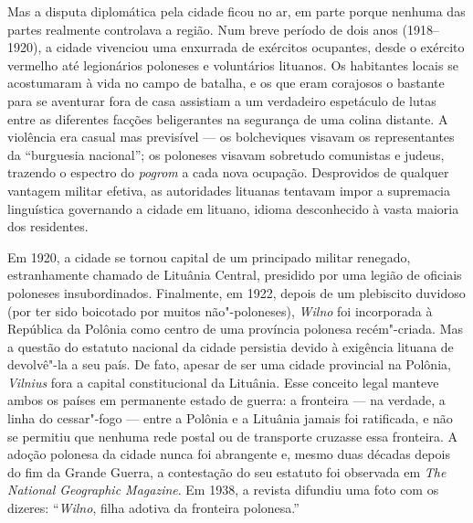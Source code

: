 Mas a disputa diplomática pela cidade ficou no ar, em parte porque
nenhuma das partes realmente controlava a região. Num breve período de
dois anos (1918--1920), a cidade vivenciou uma enxurrada de exércitos
ocupantes, desde o exército vermelho até legionários poloneses e
voluntários lituanos. Os habitantes locais se acostumaram à vida no
campo de batalha, e os que eram corajosos o bastante para se aventurar
fora de casa assistiam a um verdadeiro espetáculo de lutas entre as
diferentes facções beligerantes na segurança de uma colina distante. A
violência era casual mas previsível --- os bolcheviques visavam os
representantes da ``burguesia nacional''; os poloneses visavam sobretudo
comunistas e judeus, trazendo o espectro do \textit{pogrom} a cada nova ocupação.
Desprovidos de qualquer vantagem militar efetiva, as autoridades
lituanas tentavam impor a supremacia linguística governando a cidade em
lituano, idioma desconhecido à vasta maioria dos residentes.

Em 1920, a cidade se tornou capital de um principado militar renegado,
estranhamente chamado de Lituânia Central, presidido por uma legião de
oficiais poloneses insubordinados. Finalmente, em 1922, depois de um
plebiscito duvidoso (por ter sido boicotado por muitos não"-poloneses),
\textit{Wilno} foi incorporada à República da Polônia como centro de uma
província polonesa recém"-criada. Mas a questão do estatuto nacional da
cidade persistia devido à exigência lituana de devolvê"-la a seu país. De
fato, apesar de ser uma cidade provincial na Polônia, \textit{Vilnius} fora a
capital constitucional da Lituânia. Esse conceito legal manteve ambos os
países em permanente estado de guerra: a fronteira --- na verdade, a linha
do cessar"-fogo --- entre a Polônia e a Lituânia jamais foi ratificada, e
não se permitiu que nenhuma rede postal ou de transporte cruzasse essa
fronteira. A adoção polonesa da cidade nunca foi abrangente e, mesmo
duas décadas depois do fim da Grande Guerra, a contestação do seu
estatuto foi observada em \textit{The National Geographic Magazine}. Em
1938, a revista difundiu uma foto com os dizeres: ``\textit{Wilno}, filha adotiva
da fronteira polonesa.''

%

\asterisc


